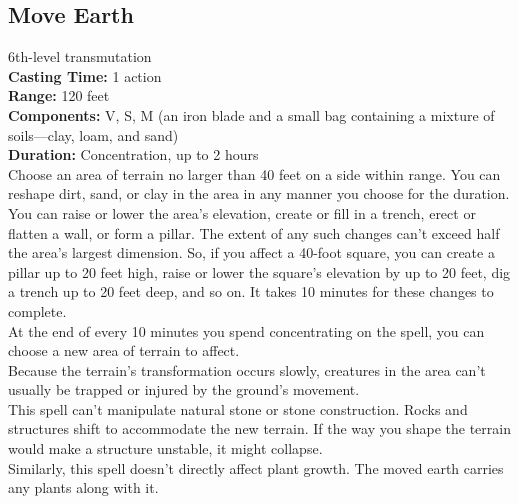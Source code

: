 \documentclass[11pt, A4paper, english]{article}
\begin{document}
		\subsection{Move Earth}
6th-level transmutation \\
\textbf{Casting Time:} 1 action \\
\textbf{Range:} 120 feet \\
\textbf{Components:} V, S, M (an iron blade and a small bag containing a mixture of soils—clay, loam, and sand) \\
\textbf{Duration:} Concentration, up to 2 hours \\
Choose an area of terrain no larger than 40 feet on a side within range. You can reshape dirt, sand, or clay in the area in any manner you choose for the duration. You can raise or lower the area’s elevation, create or fill in a trench, erect or flatten a wall, or form a pillar. The extent of any such changes can’t exceed half the area’s largest dimension. So, if you affect a 40-foot square, you can create a pillar up to 20 feet high, raise or lower the square’s elevation by up to 20 feet, dig a trench up to 20 feet deep, and so on. It takes 10 minutes for these changes to complete. \\
At the end of every 10 minutes you spend concentrating on the spell, you can choose a new area of terrain to affect. \\
Because the terrain’s transformation occurs slowly, creatures in the area can’t usually be trapped or injured by the ground’s movement. \\
This spell can’t manipulate natural stone or stone construction. Rocks and structures shift to accommodate the new terrain. If the way you shape the terrain would make a structure unstable, it might collapse. \\
Similarly, this spell doesn't directly affect plant growth. The moved earth carries any plants along with it.
\end{document}
